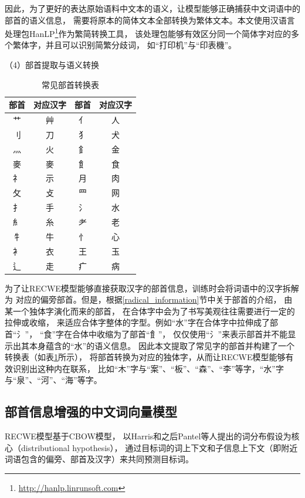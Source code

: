 \documentclass{standalone}
\begin{document}
因此，为了更好的表达原始语料中文本的语义，让模型能够正确捕获中文词语中的部首的语义信息，
需要将原本的简体文本全部转换为繁体文本。本文使用汉语言处理包HanLP\footnote{\url{http://hanlp.linrunsoft.com}}作为繁简转换工具，
该处理包能够有效区分同一个简体字对应的多个繁体字，并且可以识别简繁分歧词，
如“打印机”与“印表機”。

（4）部首提取与语义转换

\begin{table}[h]
    \caption{常见部首转换表}
    \begin{tabular}{|c|c|c|c|}
        \hline
        部首 & 对应汉字 & 部首 & 对应汉字 \\
        \hline
        艹 & 艸 & 亻 & 人\\
        \hline
        刂 & 刀 & 犭 & 犬\\
        \hline
        灬 & 火 & 釒 & 金\\
        \hline
        麥 & 麥 & 飠 & 食\\
        \hline
        礻 & 示 & 月 & 肉\\
        \hline
        攵 & 攴 & 罒 & 网\\
        \hline
        扌 & 手 & 氵 & 水\\
        \hline
        糹 & 糸 & 耂 & 老\\
        \hline
        牜 & 牛 & 忄 & 心\\
        \hline
        衤 & 衣 & 王 & 玉\\
        \hline
        辶 & 走 & 疒 & 病\\
        \hline
    \end{tabular}
    \label{char_tran_form}
    \end{table}

为了让RECWE模型能够直接获取汉字的部首信息，训练时会将词语中的汉字拆解为
对应的偏旁部首。但是，根据\ref{radical_information}节中关于部首的介绍，
由某一个独体字演化而来的部首，
在合体字中会为了书写美观往往需要进行一定的拉伸或收缩，
来适应合体字整体的字型。例如“水”字在合体字中拉伸成了部首“氵”，
“食”字在合体中收缩为了部首“飠”，
仅仅使用“氵”来表示部首并不能显示出其本身蕴含的“水”的语义信息。
因此本文提取了常见字的部首并构建了一个转换表（如表\ref{char_tran_form}所示），
将部首转换为对应的独体字，从而让RECWE模型能够有效识别出这种内在联系，
比如“木”字与“案”、“板”、“森”、“李”等字，“水”字与“泉”、“河”、“海”等字。


\subsection{部首信息增强的中文词向量模型}
\label{recwe_section}
RECWE模型基于CBOW模型，
以Harris和之后Pantel等人提出的词分布假设为核心（distributional hypothesis），
通过目标词的词上下文和子信息上下文（即附近词语包含的偏旁、部首及汉字）来共同预测目标词。
\end{document}
